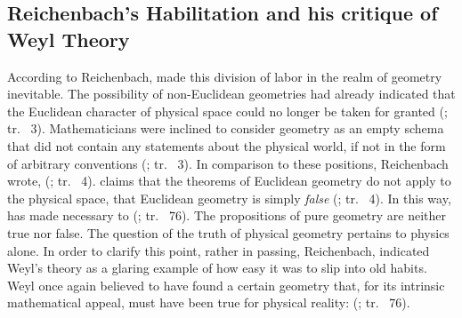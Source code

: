 \documentclass[draft]{article}
\newcommand{\WT}{Weyl's theory\xspace}
\newcommand{\rhp}[2]{(\cite[#1]{Reichenbach1920a}; tr.\ \citeyear{Reichenbach1969} #2)\xspace}
\begin{document}





\subsection{Reichenbach's Habilitation and his critique of Weyl Theory}

According to Reichenbach, \rt made this division of labor in the realm of geometry inevitable. The possibility of non-Euclidean geometries had already indicated that the  Euclidean character of physical space could no longer be taken for granted \rhp{3}{3}. Mathematicians were inclined to consider geometry as an empty schema that did not contain any statements about the physical world, if not in the form of arbitrary conventions \rhp{3}{3}. In comparison to these positions, Reichenbach wrote,  \rhp{3}{4}. \Rt claims that the theorems of Euclidean geometry do not apply to the physical space, that Euclidean geometry is simply \emph{false} \rhp{3}{4}. In this way, \rt has made necessary to  \rhp{73}{76}. The propositions of pure geometry are neither true nor false. The question of the truth of physical geometry pertains to physics alone. In order to clarify this point, rather in passing, Reichenbach, indicated \WT as a glaring example of how easy it was to slip into old habits. Weyl once again believed to have found a certain geometry that, for its intrinsic mathematical appeal, must have been true for physical reality:  \rhp{73}{76}.
\end{document}
